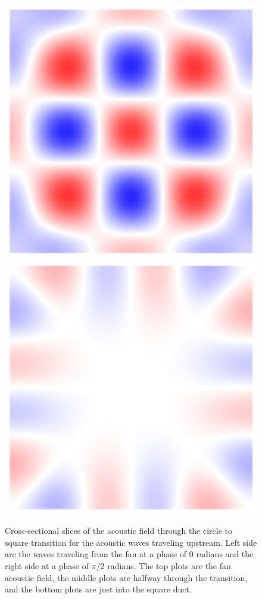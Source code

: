 \begin{figure}
  \includegraphics[trim={0.3in 0.3in 0.3in 0.3in},clip]{../matlab/03_aero_optics_acoustics/tunnel_slices/tunnel_acoustic_against_0.6_8_0_0_012.eps}
  \includegraphics[trim={0.3in 0.3in 0.3in 0.3in},clip]{../matlab/03_aero_optics_acoustics/tunnel_slices/tunnel_acoustic_against_0.6_8_0_1.5708_012.eps}
  \caption{Cross-sectional slices of the acoustic field through the circle to square transition for the acoustic waves traveling upstream. Left side are the waves traveling from the fan at a phase of 0 radians and the right side at a phase of $\pi$/2 radians. The top plots are the fan acoustic field, the middle plots are halfway through the transition, and the bottom plots are just into the square duct.}
  \label{fig:03_transition_acoustics}
\end{figure}
